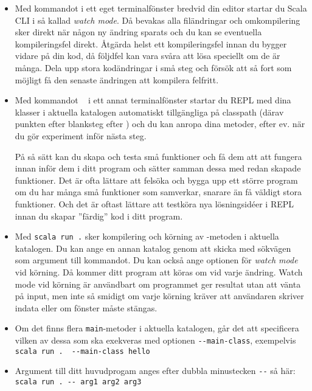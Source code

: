 \begin{itemize}
  \item Med kommandot  i ett eget terminalfönster bredvid din editor startar du Scala CLI i så kallad \textit{watch mode}. Då bevakas alla filändringar och omkompilering sker direkt när någon ny ändring sparats och du kan se eventuella kompileringsfel direkt. Åtgärda helst ett kompileringsfel innan du bygger vidare på din kod, då följdfel kan vara svåra att lösa speciellt om de är många. Dela upp stora kodändringar i små steg och försök att så fort som möjligt få den senaste ändringen att kompilera felfritt. 
  \item
    Med kommandot ~ i ett annat terminalfönster startar du REPL med dina klasser i aktuella katalogen  automatiskt tillgängliga på classpath (därav punkten efter blanksteg efter ) och du kan anropa dina metoder, efter ev.  när du gör experiment inför nästa steg. 
    
    På så sätt kan du skapa och testa små funktioner och få dem att att fungera innan inför dem i ditt program och sätter samman dessa med redan skapade funktioner. Det är ofta lättare att felsöka och bygga upp ett större program om du har många små funktioner som samverkar, snarare än få väldigt stora funktioner. Och det är oftast lättare att testköra nya lösningsidéer i REPL innan du skapar ''färdig'' kod i ditt program.
  \item
    Med \texttt{scala run .} sker kompilering och körning av -metoden i aktuella katalogen. Du kan ange en annan katalog genom att skicka med sökvägen som argument till kommandot.  Du kan också ange optionen  för \textit{watch mode} vid körning. Då kommer ditt program att köras om vid varje ändring. Watch mode vid körning är användbart om programmet ger resultat utan att vänta på input, men inte så smidigt om varje körning kräver att användaren skriver indata eller om fönster måste stängas.
  \item
    Om det finns flera \texttt{main}-metoder i aktuella katalogen, går det att specificera vilken av dessa som ska exekveras med optionen \verb|--main-class|, exempelvis\\ \verb|scala run .  --main-class hello| 
  \item Argument till ditt huvudprogam anges efter dubbla minustecken \verb|--| så här: \\\verb|scala run . -- arg1 arg2 arg3|
\end{itemize}




